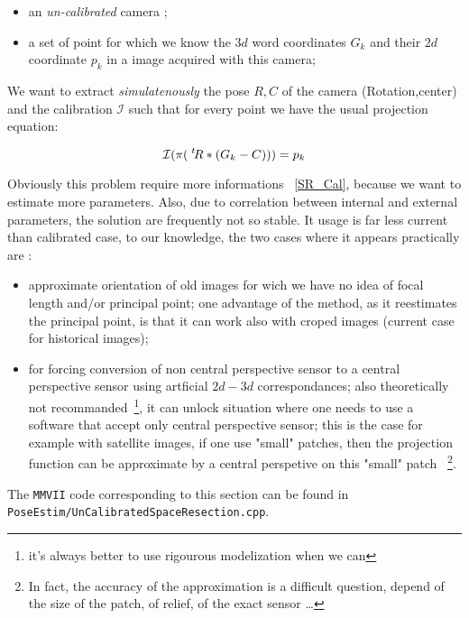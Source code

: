 \begin{itemize}
   \item an \emph{un-calibrated} camera ;
   \item a set of point for which we know the  $3d$ word coordinates $G_k$ and their 
        $2d$ coordinate $p_k$ in a image acquired with this camera;
\end{itemize}


We want to extract \emph{simulatenously} the pose $R,C$ of the camera (Rotation,center)  and the calibration
$\mathcal I$ such that for every point we have the usual projection equation:

\begin{equation}
       \mathcal I(\pi (\; ^{t} \! R*(G_k-C))) = p_k \label{EQ:PROJ}
\end{equation}

Obviously this problem require more informations ~\ref{SR_Cal}, because we want to estimate more parameters.
Also, due to correlation between internal and external parameters, the solution
are frequently not so stable. It usage is far less current than calibrated case,
to our knowledge, the two cases where it appears practically are :


\begin{itemize}
   \item approximate  orientation of old images for wich we have no idea of focal length and/or principal
        point; one advantage of the method, as it reestimates the principal point, is that it can work
        also with croped images (current case for historical images);

   \item for forcing conversion of  non central perspective sensor to a central perspective sensor
        using  artficial $2d-3d$ correspondances; also theoretically not recommanded~\footnote{it's
        always better to use rigourous modelization when we can}, it can unlock situation where one needs to
        use a software that accept only central perspective sensor; this is the case for example
        with satellite images, if one use "small" patches, then the projection  function can be
        approximate by a central perspetive on this "small" patch ~\footnote{In fact, the accuracy of
        the approximation is a difficult question, depend of the size of the patch, of relief, 
        of the exact sensor \dots}.
\end{itemize}

The {\tt MMVII} code corresponding to this section can be found in 
{\tt PoseEstim/UnCalibratedSpaceResection.cpp}.

